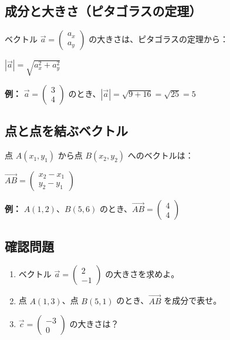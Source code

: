 \documentclass[paper=a4,fleqn]{jlreq}
\newcommand{\formula}[1]{%
  \vspace{4pt}%
  \begin{center}{\large\bfseries\boldmath\(\displaystyle #1\)}\end{center}%
  \vspace{4pt}%
}
\begin{document}
\subsection{成分と大きさ（ピタゴラスの定理）}

ベクトル \(\vec{a} = \begin{pmatrix} a_x \\ a_y \end{pmatrix}\) の大きさは、ピタゴラスの定理から：

\formula{|\vec{a}| = \sqrt{a_x^2 + a_y^2}}

\textbf{例：} \(\vec{a} = \begin{pmatrix} 3 \\ 4 \end{pmatrix}\) のとき、\(|\vec{a}| = \sqrt{9 + 16} = \sqrt{25} = 5\)

\subsection{点と点を結ぶベクトル}

点 \(A(x_1, y_1)\) から点 \(B(x_2, y_2)\) へのベクトルは：

\formula{\overrightarrow{AB} = \begin{pmatrix} x_2 - x_1 \\ y_2 - y_1 \end{pmatrix}}

\textbf{例：} \(A(1, 2)\)、\(B(5, 6)\) のとき、\(\overrightarrow{AB} = \begin{pmatrix} 4 \\ 4 \end{pmatrix}\)

\subsection{確認問題}
\begin{enumerate}
  \item ベクトル \(\vec{a} = \begin{pmatrix} 2 \\ -1 \end{pmatrix}\) の大きさを求めよ。
  \item 点 \(A(1, 3)\)、点 \(B(5, 1)\) のとき、\(\overrightarrow{AB}\) を成分で表せ。
  \item \(\vec{c} = \begin{pmatrix} -3 \\ 0 \end{pmatrix}\) の大きさは？
\end{enumerate}
\end{document}

